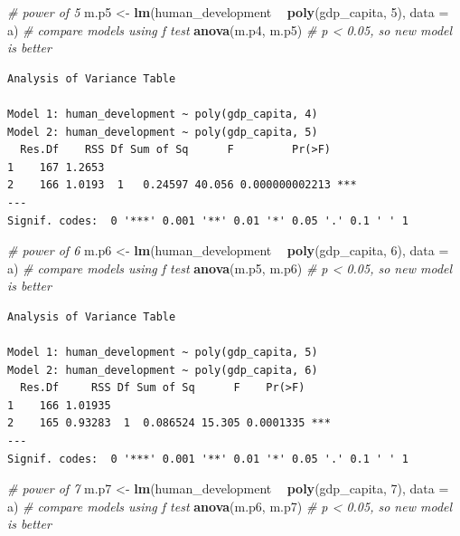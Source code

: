 \documentclass[]{article}
\newenvironment{Shaded}{\begin{snugshade}}{\end{snugshade}}
\newcommand{\KeywordTok}[1]{\textcolor[rgb]{0.13,0.29,0.53}{\textbf{#1}}}
\newcommand{\DataTypeTok}[1]{\textcolor[rgb]{0.13,0.29,0.53}{#1}}
\newcommand{\DecValTok}[1]{\textcolor[rgb]{0.00,0.00,0.81}{#1}}
\newcommand{\StringTok}[1]{\textcolor[rgb]{0.31,0.60,0.02}{#1}}
\newcommand{\CommentTok}[1]{\textcolor[rgb]{0.56,0.35,0.01}{\textit{#1}}}
\newcommand{\OperatorTok}[1]{\textcolor[rgb]{0.81,0.36,0.00}{\textbf{#1}}}
\newcommand{\NormalTok}[1]{#1}
\theoremstyle{definition}
\theoremstyle{definition}
\theoremstyle{definition}
\theoremstyle{remark}
\begin{document}
\begin{Shaded}
\begin{Highlighting}[]
\CommentTok{# power of 5}
\NormalTok{m.p5 <-}\StringTok{ }\KeywordTok{lm}\NormalTok{(human_development }\OperatorTok{~}\StringTok{ }\KeywordTok{poly}\NormalTok{(gdp_capita, }\DecValTok{5}\NormalTok{), }\DataTypeTok{data =}\NormalTok{ a)}
\CommentTok{# compare models using f test}
\KeywordTok{anova}\NormalTok{(m.p4, m.p5) }\CommentTok{# p < 0.05, so new model is better}
\end{Highlighting}
\end{Shaded}

\begin{verbatim}
Analysis of Variance Table

Model 1: human_development ~ poly(gdp_capita, 4)
Model 2: human_development ~ poly(gdp_capita, 5)
  Res.Df    RSS Df Sum of Sq      F         Pr(>F)    
1    167 1.2653                                       
2    166 1.0193  1   0.24597 40.056 0.000000002213 ***
---
Signif. codes:  0 '***' 0.001 '**' 0.01 '*' 0.05 '.' 0.1 ' ' 1
\end{verbatim}

\begin{Shaded}
\begin{Highlighting}[]
\CommentTok{# power of 6}
\NormalTok{m.p6 <-}\StringTok{ }\KeywordTok{lm}\NormalTok{(human_development }\OperatorTok{~}\StringTok{ }\KeywordTok{poly}\NormalTok{(gdp_capita, }\DecValTok{6}\NormalTok{), }\DataTypeTok{data =}\NormalTok{ a)}
\CommentTok{# compare models using f test}
\KeywordTok{anova}\NormalTok{(m.p5, m.p6) }\CommentTok{# p < 0.05, so new model is better}
\end{Highlighting}
\end{Shaded}

\begin{verbatim}
Analysis of Variance Table

Model 1: human_development ~ poly(gdp_capita, 5)
Model 2: human_development ~ poly(gdp_capita, 6)
  Res.Df     RSS Df Sum of Sq      F    Pr(>F)    
1    166 1.01935                                  
2    165 0.93283  1  0.086524 15.305 0.0001335 ***
---
Signif. codes:  0 '***' 0.001 '**' 0.01 '*' 0.05 '.' 0.1 ' ' 1
\end{verbatim}

\begin{Shaded}
\begin{Highlighting}[]
\CommentTok{# power of 7}
\NormalTok{m.p7 <-}\StringTok{ }\KeywordTok{lm}\NormalTok{(human_development }\OperatorTok{~}\StringTok{ }\KeywordTok{poly}\NormalTok{(gdp_capita, }\DecValTok{7}\NormalTok{), }\DataTypeTok{data =}\NormalTok{ a)}
\CommentTok{# compare models using f test}
\KeywordTok{anova}\NormalTok{(m.p6, m.p7) }\CommentTok{# p < 0.05, so new model is better}
\end{Highlighting}
\end{Shaded}
\end{document}
